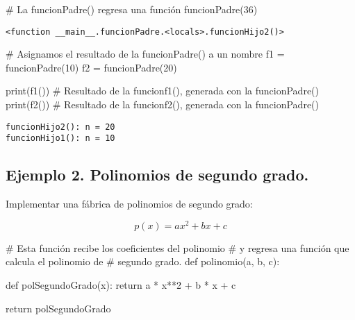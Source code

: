 \documentclass[
  letterpaper,
  DIV=11,
  numbers=noendperiod]{scrreprt}
\newenvironment{Shaded}{\begin{snugshade}}{\end{snugshade}}
\newcommand{\BuiltInTok}[1]{\textcolor[rgb]{0.00,0.23,0.31}{#1}}
\newcommand{\CommentTok}[1]{\textcolor[rgb]{0.37,0.37,0.37}{#1}}
\newcommand{\ControlFlowTok}[1]{\textcolor[rgb]{0.00,0.23,0.31}{#1}}
\newcommand{\DecValTok}[1]{\textcolor[rgb]{0.68,0.00,0.00}{#1}}
\newcommand{\KeywordTok}[1]{\textcolor[rgb]{0.00,0.23,0.31}{#1}}
\newcommand{\NormalTok}[1]{\textcolor[rgb]{0.00,0.23,0.31}{#1}}
\newcommand{\OperatorTok}[1]{\textcolor[rgb]{0.37,0.37,0.37}{#1}}
\begin{document}
\begin{Shaded}
\begin{Highlighting}[]
\CommentTok{\# La funcionPadre() regresa una función}
\NormalTok{funcionPadre(}\DecValTok{36}\NormalTok{)}
\end{Highlighting}
\end{Shaded}

\begin{verbatim}
<function __main__.funcionPadre.<locals>.funcionHijo2()>
\end{verbatim}

\begin{Shaded}
\begin{Highlighting}[]
\CommentTok{\# Asignamos el resultado de la funcionPadre() a un nombre}
\NormalTok{f1 }\OperatorTok{=}\NormalTok{ funcionPadre(}\DecValTok{10}\NormalTok{)}
\NormalTok{f2 }\OperatorTok{=}\NormalTok{ funcionPadre(}\DecValTok{20}\NormalTok{)}
\end{Highlighting}
\end{Shaded}

\begin{Shaded}
\begin{Highlighting}[]
\BuiltInTok{print}\NormalTok{(f1()) }\CommentTok{\# Resultado de la funcionf1(), generada con la funcionPadre()}
\BuiltInTok{print}\NormalTok{(f2()) }\CommentTok{\# Resultado de la funcionf2(), generada con la funcionPadre()}
\end{Highlighting}
\end{Shaded}

\begin{verbatim}
funcionHijo2(): n = 20
funcionHijo1(): n = 10
\end{verbatim}

\subsection{\texorpdfstring{\textbf{Ejemplo 2. Polinomios de segundo
grado.}}{Ejemplo 2. Polinomios de segundo grado.}}\label{ejemplo-2.-polinomios-de-segundo-grado.}

Implementar una fábrica de polinomios de segundo grado:

\[
p(x) = a x^2 + b x + c
\]

\begin{Shaded}
\begin{Highlighting}[]
\CommentTok{\# Esta función recibe los coeficientes del polinomio}
\CommentTok{\# y regresa una función que calcula el polinomio de}
\CommentTok{\# segundo grado.}
\KeywordTok{def}\NormalTok{ polinomio(a, b, c):}
    
    \KeywordTok{def}\NormalTok{ polSegundoGrado(x):}
        \ControlFlowTok{return}\NormalTok{ a }\OperatorTok{*}\NormalTok{ x}\OperatorTok{**}\DecValTok{2} \OperatorTok{+}\NormalTok{ b }\OperatorTok{*}\NormalTok{ x }\OperatorTok{+}\NormalTok{ c}
    
    \ControlFlowTok{return}\NormalTok{ polSegundoGrado}
\end{Highlighting}
\end{Shaded}
\end{document}
